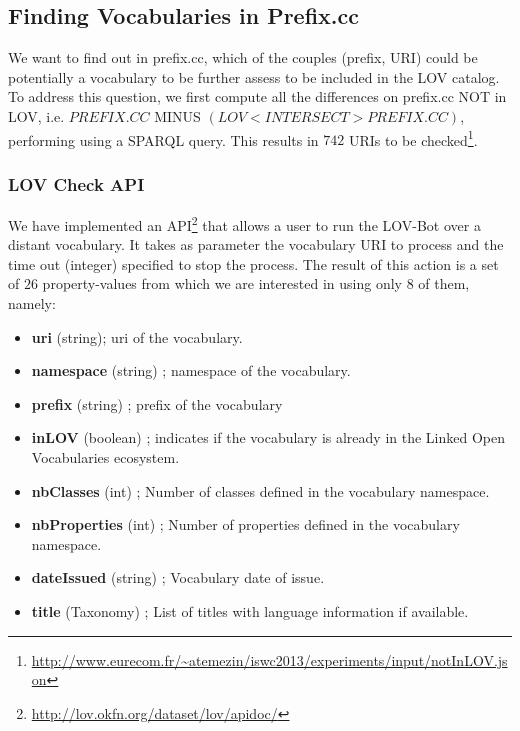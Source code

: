 
\subsection{Finding Vocabularies in Prefix.cc}   \label{sec:finding}
We want to find out in prefix.cc, which of the couples (prefix, URI) could be potentially a vocabulary to be further assess to be included in the LOV catalog. To address this question, we first compute all the differences on prefix.cc NOT in LOV, i.e. $PREFIX.CC$ MINUS $(LOV <INTERSECT> PREFIX.CC)$, performing using a SPARQL query. This results in $742$ URIs to be checked\footnote{\url{http://www.eurecom.fr/~atemezin/iswc2013/experiments/input/notInLOV.json}}.

\subsubsection{LOV Check API}
We have implemented an API\footnote{\url{http://lov.okfn.org/dataset/lov/apidoc/}} that allows a user to run the LOV-Bot over a distant vocabulary. It takes as parameter the vocabulary URI to process and the time out (integer) specified to stop the process. The result of this action is a set of $26$ property-values from which we are interested in using only $8$ of them, namely:
\begin{itemize}
 \item \textbf{uri} (string); uri of the vocabulary.
 \item \textbf{namespace} (string) ; namespace of the vocabulary.
 \item {\textbf{prefix} (string) ;  prefix of the vocabulary}
 \item{\textbf{inLOV} (boolean) ; indicates if the vocabulary is already in the Linked Open Vocabularies ecosystem}.
 \item {\textbf{nbClasses} (int) ; Number of classes defined in the vocabulary namespace}.
 \item{\textbf{nbProperties} (int) ; Number of properties defined in the vocabulary namespace}.
 \item{\textbf{dateIssued }(string) ; Vocabulary date of issue}.
 \item{\textbf{title} (Taxonomy) ; List of titles with language information if available}.
\end{itemize}

